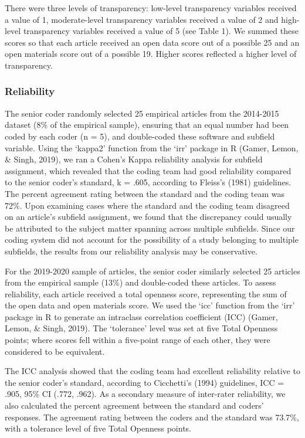 \documentclass[
  english,
  man,floatsintext]{apa6}
\begin{document}
There were three levels of transparency: low-level transparency variables received a value of 1, moderate-level transparency variables received a value of 2 and high-level transparency variables received a value of 5 (see Table 1). We summed these scores so that each article received an open data score out of a possible 25 and an open materials score out of a possible 19. Higher scores reflected a higher level of transparency.

\hypertarget{reliability}{%
\subsubsection{Reliability}\label{reliability}}

The senior coder randomly selected 25 empirical articles from the 2014-2015 dataset (8\% of the empirical sample), ensuring that an equal number had been coded by each coder (n = 5), and double-coded these software and subfield variable. Using the `kappa2' function from the `irr' package in R (Gamer, Lemon, \& Singh, 2019), we ran a Cohen's Kappa reliability analysis for subfield assignment, which revealed that the coding team had good reliability compared to the senior coder's standard, k = .605, according to Fleiss's (1981) guidelines. The percent agreement rating between the standard and the coding team was 72\%. Upon examining cases where the standard and the coding team disagreed on an article's subfield assignment, we found that the discrepancy could usually be attributed to the subject matter spanning across multiple subfields. Since our coding system did not account for the possibility of a study belonging to multiple subfields, the results from our reliability analysis may be conservative.

For the 2019-2020 sample of articles, the senior coder similarly selected 25 articles from the empirical sample (13\%) and double-coded these articles. To assess reliability, each article received a total openness score, representing the sum of the open data and open materials score. We used the `icc' function from the `irr' package in R to generate an intraclass correlation coefficient (ICC) (Gamer, Lemon, \& Singh, 2019). The `tolerance' level was set at five Total Openness points; where scores fell within a five-point range of each other, they were considered to be equivalent.

The ICC analysis showed that the coding team had excellent reliability relative to the senior coder's standard, according to Cicchetti's (1994) guidelines, ICC = .905, 95\% CI (.772, .962). As a secondary measure of inter-rater reliability, we also calculated the percent agreement between the standard and coders' responses. The agreement rating between the coders and the standard was 73.7\%, with a tolerance level of five Total Openness points.
\end{document}
